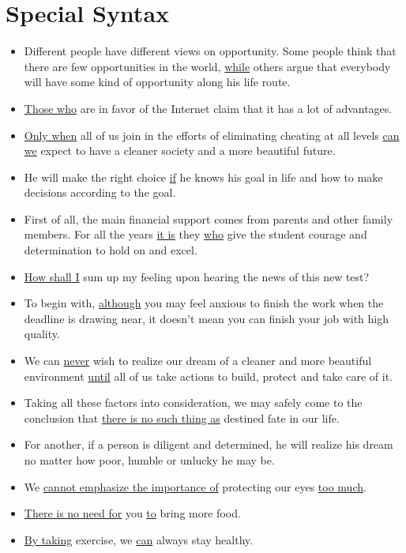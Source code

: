 \chapter{Special Syntax}
\begin{itemize}
    \item Different people have different views on opportunity. Some people think that
     there are few opportunities in the world, \uline{while} others argue that everybody will
      have some kind of opportunity along his life route.
    \item \uline{Those who} are in favor of the Internet claim that it has a lot of advantages.
    \item \uline{Only when} all of us join in the efforts of eliminating cheating at all levels
    \uline{can we} expect to have a cleaner society and a more beautiful future.
    \item He will make the right choice \uline{if} he knows his goal in life and how to make 
    decisions according to the goal.
    \item First of all, the main financial support comes from parents and other family
     members. For all the years \uline{it is} they \uline{who} give the student courage and 
     determination to hold on and excel.
    \item \uline{How shall I} sum up my feeling upon hearing the news of this new test?
    \item To begin with, \uline{although} you may feel anxious to finish the work when 
    the deadline is drawing near, it doesn't mean you can finish your job with 
    high quality.
    \item We can \uline{never} wish to realize our dream of a cleaner and more beautiful
     environment \uline{until} all of us take actions to build, protect and take care of it.
    \item Taking all these factors into consideration, we may safely come to the conclusion
     that \uline{there is no such thing as} destined fate in our life.
    \item For another, if a person is diligent and determined, he will realize his
     dream no matter how poor, humble or unlucky he may be.
    \item We \uline{cannot emphasize the importance of} protecting our eyes \uline{too much}.
    \item \uline{There is no need for} you \uline{to} bring more food.
    \item \uline{By taking} exercise, we \uline{can} always stay healthy.

\end{itemize}
